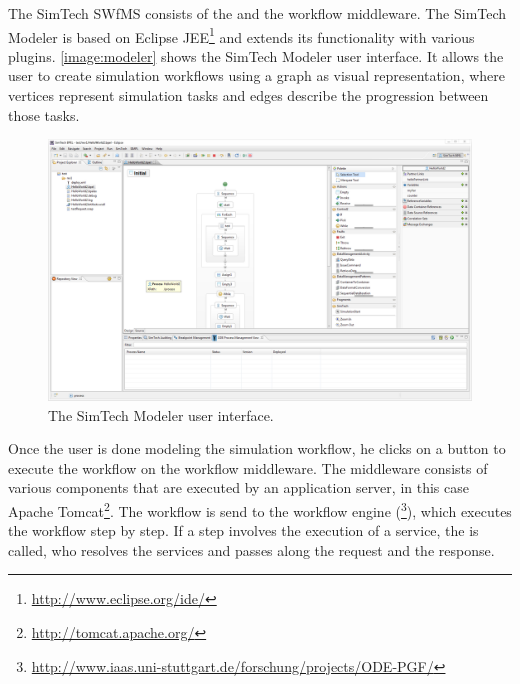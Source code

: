 The SimTech SWfMS consists of the  and the workflow middleware.
The SimTech Modeler is based on Eclipse JEE\footnote{\url{http://www.eclipse.org/ide/}} and extends its functionality with various plugins.
\autoref{image:modeler} shows the SimTech Modeler user interface.
It allows the user to create simulation workflows using a graph as visual representation, where vertices represent simulation tasks and edges describe the progression between those tasks.

\begin{figure}[!htbp]
	\centering
	\includegraphics[width=\textwidth,interpolate=false]{fundamentals/assets/simtech_modeler}
	\caption{The SimTech Modeler user interface.}
	\label{image:modeler}
\end{figure}

Once the user is done modeling the simulation workflow, he clicks on a button to execute the workflow on the workflow middleware.
The middleware consists of various components that are executed by an application server, in this case Apache Tomcat\footnote{\url{http://tomcat.apache.org/}}.
The workflow is send to the workflow engine (\footnote{\url{http://www.iaas.uni-stuttgart.de/forschung/projects/ODE-PGF/}}), which executes the workflow step by step.
If a step involves the execution of a service, the  is called, who resolves the services and passes along the request and the response.
